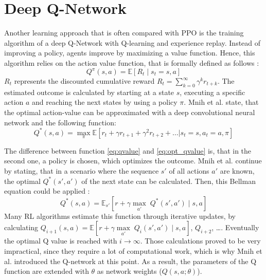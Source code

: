 \section{Deep Q-Network}\label{dqn}
Another learning approach that is often compared with PPO is the training algorithm of a deep Q-Network with Q-learning and experience replay. Instead of improving a policy, agents improve by maximizing a value function. Hence, this algorithm relies on the action value function, that is formally defined as follows \cite{mnba16}:
\begin{equation}\label{eq:qvalue}
    Q^\pi(s,a) = \mathbb{E} \left[ R_t \mid s_t = s,a \right]
\end{equation} 
$R_t$ represents the discounted cumulative reward $R_t=\sum^{\infty}_{k=0} \gamma^k r_{t+k}$. The estimated outcome is calculated by starting at a state $s$, executing a specific action $a$ and reaching the next states by using a policy $\pi$. Mnih et al. \cite{mnka15} state, that the optimal action-value can be approximated with a deep convolutional neural network and the following function:
\begin{equation}\label{eq:opt_qvalue}
    Q^*(s,a) =  \underset{\pi} \max \mathbb{E}\left[ r_{t} + \gamma r_{t+1} + \gamma^2 r_{t+2} + \ldots | s_t = s, a_t = a, \pi \right]
\end{equation}

The difference between function \eqref{eq:qvalue} and \eqref{eq:opt_qvalue} is, that in the second one, a policy is chosen, which optimizes the outcome. Mnih et al. continue by stating, that in a scenario where the sequence $s'$ of all actions $a'$ are known, the optimal $Q^*(s',a')$ of the next state can be calculated. Then, this Bellman equation could be applied \cite{mnba16}: 
\begin{equation}\label{eq:bel_qvalue}
    Q^*(s,a) =  \mathbb{E}_{s'} \left[ r+ \gamma \underset{a'}\max \; Q^* (s', a') \mid s,a \right]
\end{equation}
Many RL algorithms estimate this function through iterative updates, by calculating $Q_{i+1}(s,a) =  \mathbb{E} \left[ r+ \gamma \underset{a'}\max \; Q_i (s', a') \mid s,a \right]$, $Q_{i+2}$, \dots \cite{mnka13}. Eventually the optimal Q value is reached with $i\rightarrow \infty$. Those calculations proved to be very impractical, since they require a lot of computational work, which is why Mnih et al. introduced the Q-network at this point. As a result, the parameters of the Q function are extended with $\theta$ as network weights ($Q(s,a;\theta)$).

